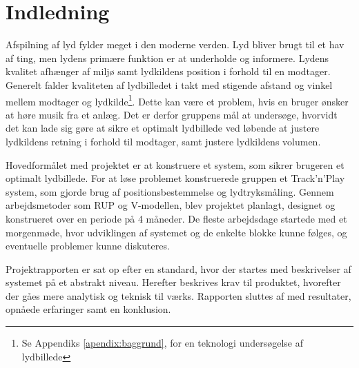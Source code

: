 \chapter{Indledning}
\label{chap:indledning}

Afspilning af lyd fylder meget i den moderne verden. Lyd bliver brugt til et hav af ting, men lydens primære funktion er at underholde og informere. Lydens kvalitet afhænger af miljø samt lydkildens position i forhold til en modtager. Generelt falder kvaliteten af lydbilledet i takt med stigende afstand og vinkel mellem modtager og lydkilde\footnote{Se Appendiks \ref{apendix:baggrund}, for en teknologi undersøgelse af lydbillede}. Dette kan være et problem, hvis en bruger ønsker at høre musik fra et anlæg. Det er derfor gruppens mål at undersøge, hvorvidt det kan lade sig gøre at sikre et optimalt lydbillede ved løbende at justere lydkildens retning i forhold til modtager, samt justere lydkildens volumen.


Hovedformålet med projektet er at konstruere et system, som sikrer brugeren et optimalt lydbillede. 
For at løse problemet konstruerede gruppen et Track'n'Play system, som gjorde brug af positionsbestemmelse og lydtryksmåling. Gennem arbejdsmetoder som RUP og V-modellen, blev projektet planlagt,
designet og konstrueret over en periode på 4 måneder. De fleste arbejdsdage startede med et morgenmøde, hvor udviklingen af systemet og de enkelte blokke kunne følges, og eventuelle problemer kunne diskuteres. 

Projektrapporten er sat op efter en standard, hvor der startes med beskrivelser af systemet på et abstrakt niveau. Herefter beskrives krav til produktet, hvorefter der gåes mere analytisk og teknisk til værks. Rapporten sluttes af med resultater, opnåede erfaringer samt en konklusion.


%

%